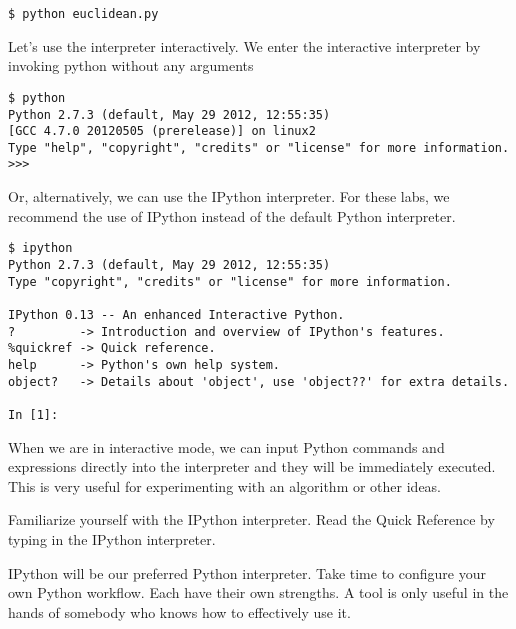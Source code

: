 \begin{lstlisting}
$ python euclidean.py
\end{lstlisting}
Let's use the interpreter interactively. 
We enter the interactive interpreter by invoking python without any arguments
\begin{lstlisting}
$ python
Python 2.7.3 (default, May 29 2012, 12:55:35) 
[GCC 4.7.0 20120505 (prerelease)] on linux2
Type "help", "copyright", "credits" or "license" for more information.
>>> 
\end{lstlisting}
Or, alternatively, we can use the IPython interpreter.  
For these labs, we recommend the use of IPython instead of the default Python interpreter.
\begin{lstlisting}
$ ipython
Python 2.7.3 (default, May 29 2012, 12:55:35) 
Type "copyright", "credits" or "license" for more information.

IPython 0.13 -- An enhanced Interactive Python.
?         -> Introduction and overview of IPython's features.
%quickref -> Quick reference.
help      -> Python's own help system.
object?   -> Details about 'object', use 'object??' for extra details.

In [1]: 
\end{lstlisting}
When we are in interactive mode, we can input Python commands and expressions directly into the interpreter and they will be immediately executed. 
This is very useful for experimenting with an algorithm or other ideas.

\begin{problem}
Familiarize yourself with the IPython interpreter.  Read the Quick Reference by typing  in the IPython interpreter.

IPython will be our preferred Python interpreter.  Take time to configure your own Python
workflow.  Each have their own strengths.  A tool is only useful in the hands of somebody
who knows how to effectively use it.
\end{problem}
